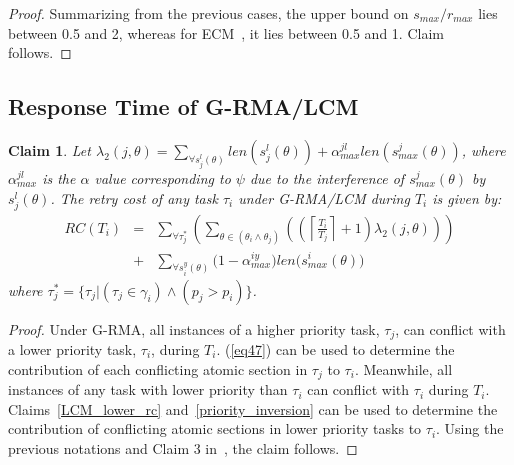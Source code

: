 \documentclass[a4paper,english]{article}
\newtheorem{clm}{Claim}
\newtheorem{proof}{Proof}
\begin{document}
\begin{proof}
Summarizing from the previous cases, the upper bound on $s_{max}/r_{max}$
lies between 0.5 and 2, whereas for ECM~\cite{stmconcurrencycontrol:emsoft11},
it lies between 0.5 and 1. Claim follows.

\end{proof}

\subsection{Response Time of G-RMA/LCM}
\label{rma}

\begin{clm}\label{response g-rma/lcm}
Let $\lambda_{2}(j,\theta)=\sum_{\forall s_{j}^{l}(\theta)}len(s_{j}^{l}(\theta))+\alpha_{max}^{jl}len(s_{max}^{j}(\theta))$, where $\alpha_{max}^{jl}$ is the $\alpha$ value corresponding to $\psi$ due to the interference of $s_{max}^j(\theta)$ by $s_j^l(\theta)$. The retry cost of any task $\tau_i$ under G-RMA/LCM during $T_i$ 
is given by:
\begin{eqnarray}
RC\left(T_i\right) & = &
  \sum_{\forall \tau_{j}^{*}}\left(\sum_{\theta\in(\theta_{i}\wedge\theta_{j})}\left(\left(\left\lceil\frac{T_i}{T_{j}}\right\rceil +1\right)\lambda_{2}(j,\theta)\right)\right)\nonumber\\
& + & \sum_{\forall s_{i}^{y}(\theta)}\Big(1-\alpha_{max}^{iy}\Big)len\Big(s_{max}^i(\theta)\Big)
\label{eq60}
\end{eqnarray}
where $\tau_{j}^{*}=\{\tau_{j}|(\tau_{j}\in\gamma_{i})\wedge(p_{j}>p_{i})\}$.
\end{clm}

\begin{proof}\normalfont
Under G-RMA, all instances of a higher priority task, $\tau_{j}$, can conflict with a lower priority task,
$\tau_{i}$, during $T_{i}$. (\ref{eq47}) can be used to determine the contribution of each conflicting atomic section in $\tau_j$ to $\tau_i$. Meanwhile, all instances of any task with lower priority than $\tau_{i}$ can conflict with $\tau_i$ during $T_{i}$. Claims~\ref{LCM_lower_rc} and~\ref{priority_inversion} can be used to determine the contribution of conflicting atomic sections in lower priority tasks to $\tau_i$.
%
Using the previous notations and Claim 3 in~\cite{stmconcurrencycontrol:emsoft11}, the claim follows.
\end{proof}
\end{document}
